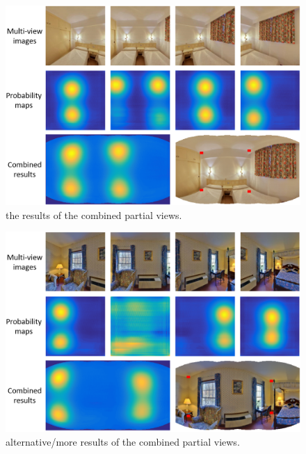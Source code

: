 \begin{figure}
	\centering
	\includegraphics[width=\linewidth]{figs/partial1.png}
	\caption{the results of the combined partial views. }
	\label{fig:results1}
\end{figure}

\begin{figure}
	\centering
	\includegraphics[width=\linewidth]{figs/partial2.png}
	\caption{alternative/more results of the combined partial views. }
	\label{fig:results1}
\end{figure}


